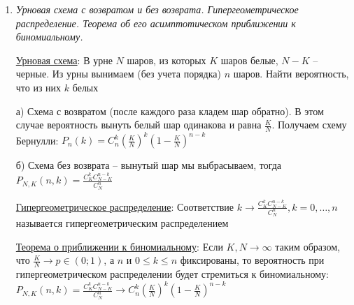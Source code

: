 \begin{enumerate}
    \hyperlink{bernoullischema2}{Схема Бернулли}: $\letsymbol v_n$ -- число успехов в серии из $n$ испытаний; 
    $P_n(v_n = k) = C^k_n p^k q^{n - k}, \quad\quad k = 0, 1, \dots, n$

    \hyperlink{binomialdistribution}{Биномиальное распределение}: Соответствие $k \rightarrow C^k_n p^k q^{n - k}, \quad k = 0, \dots, n$ называется биномиальным распределением
    (обозначается $B_{n,p}$ или $B(n, p)$)

    \hyperlink{untilfirstsuccessschema}{Схема до первого успеха}: Пусть проводится бесконечная серия испытаний, которая заканчивается после первого успешного испытания
    под номером $\tau$, тогда вероятность $P(\tau = k) = q^{k - 1} p, \quad\quad k = 1, 2, \dots$

    \hyperlink{geometricdistribution}{Геометрическое распределение}: Соответствие $k \rightarrow q^{k - 1} p, k \in \Natural$ называется геометрическим
    распределение вероятности (обозначается $G_p$ или $G(p)$)

    Геометрическое распределение обладает свойством \enquote{нестарения} или свойством отсутствия
    последействия: \Ths $\letsymbol P(\tau = k) = q^{k - 1} p, k \in \Natural$. Тогда $\forall n, k \geq 0 \quad P(\tau > n + k \ | \ \tau > n) = P(\tau > k)$

    \item \textit{Урновая схема с возвратом и без возврата. Гипергеометрическое распределение. Теорема об его асимптотическом приближении к биномиальному.}

    \hyperlink{urnschema}{Урновая схема}: В урне $N$ шаров, из которых $K$ шаров белые, $N - K$ -- черные.
    Из урны вынимаем (без учета порядка) $n$ шаров. Найти вероятность, что из них $k$ белых

    а) Схема с возвратом (после каждого раза кладем шар обратно). В этом случае вероятность вынуть белый шар одинакова и
    равна $\frac{K}{N}$. Получаем схему Бернулли: $P_n(k) = C^k_n \left(\frac{K}{N}\right)^k \left(1 - \frac{K}{N}\right)^{n - k}$

    б) Схема без возврата -- вынутый шар мы выбрасываем, тогда
    $P_{N, K} (n, k) = \frac{C^k_K C^{n - k}_{N - K}}{C^n_N}$

    \hyperlink{hypergeometricdistribution}{Гипергеометрическое распределение}: Соответствие $k \rightarrow \frac{C^k_K C^{n - k}_{N - K}}{C^n_N}, k = 0, \dots, n$ называется гипергеометрическим
    распределением

    \hyperlink{hypergeometricasimptotic}{Теорема о приближении к биномиальному}: \Ths Если $K, N \to \infty$ таким образом, что $\frac{K}{N} \to p \in (0;1)$, а $n$ и $0 \leq k \leq n$ фиксированы, то
    вероятность при гипергеометрическом распределении будет стремиться к биномиальному:
    $P_{N,K} (n, k) = \frac{C^k_K C^{n - k}_{N - K}}{C^n_N} \rightarrow C^k_n \left(\frac{K}{N}\right)^k \left(1 - \frac{K}{N}\right)^{n - k}$


\end{enumerate}
